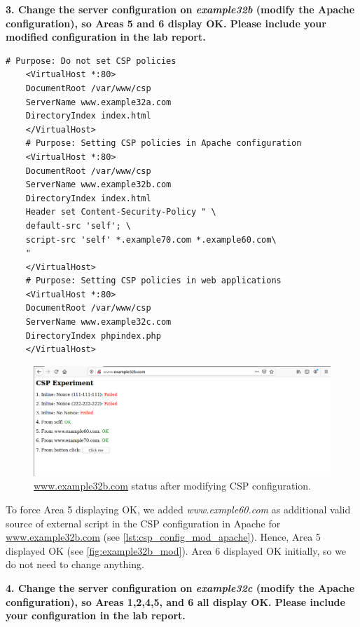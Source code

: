 \textbf{3. Change the server configuration on \emph{example32b} (modify the Apache
configuration), so Areas 5 and 6 display OK. Please include your modified configuration
in the lab report.}

\begin{lstlisting}[caption=Modified CSP configuration by Apache.,
    label={lst:csp_config_mod_apache}]
    # Purpose: Do not set CSP policies
    <VirtualHost *:80>
    DocumentRoot /var/www/csp
    ServerName www.example32a.com
    DirectoryIndex index.html
    </VirtualHost>
    # Purpose: Setting CSP policies in Apache configuration
    <VirtualHost *:80>
    DocumentRoot /var/www/csp
    ServerName www.example32b.com
    DirectoryIndex index.html
    Header set Content-Security-Policy " \
    default-src 'self'; \
    script-src 'self' *.example70.com *.example60.com\
    "
    </VirtualHost>
    # Purpose: Setting CSP policies in web applications
    <VirtualHost *:80>
    DocumentRoot /var/www/csp
    ServerName www.example32c.com
    DirectoryIndex phpindex.php
    </VirtualHost> 
\end{lstlisting}

\begin{figure}[h]
    \centering
    \includegraphics[height=\textheight,width=\textwidth,keepaspectratio]
    {figures/example_b_modified.png}
    \caption{\url{www.example32b.com} status after modifying CSP configuration.}
    \label{fig:example32b_mod}
\end{figure}

To force Area 5 displaying OK, we added \emph{www.exmple60.com} as additional valid source of
external script in the CSP configuration in Apache for \url{www.example32b.com}
(see \autoref{lst:csp_config_mod_apache}). Hence, Area 5 displayed OK (see \autoref{fig:example32b_mod}).
Area 6 displayed OK initially, so we do not need to change anything.

\textbf{4. Change the server configuration on \emph{example32c} (modify the Apache
configuration), so Areas 1,2,4,5, and 6 all display OK. Please include your configuration
in the lab report.}

